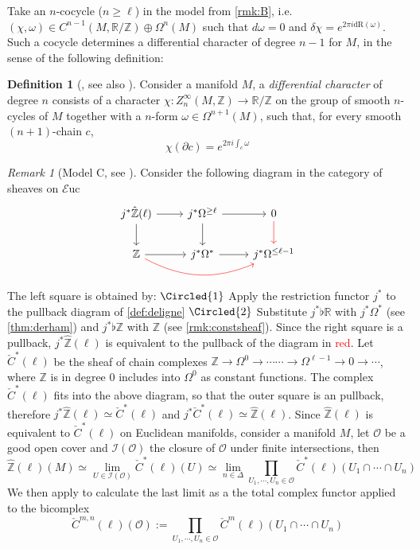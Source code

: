 \documentclass[10pt]{amsart}
\newcommand{\I}{\mathscr{I}}
\newcommand{\bR}{\mathbb{R}}
\newcommand{\bZ}{\mathbb{Z}}
\newcommand{\Euc}{\mathscr{E}\mathrm{uc}}
\newcommand{\dr}{\mathrm{dR}}
\theoremstyle{definition}
\newtheorem{definition}[equation]{Definition}
\theoremstyle{remark}
\newtheorem{remark}[equation]{Remark}
\numberwithin{equation}{section}
\begin{document}
Take an $n$-cocycle ($n\geq\ell$) in the model from \cref{rmk:B}, i.e. $(\chi,\omega)\in C^{n-1}(M,\bR/\bZ)\oplus\Omega^{n}(M)$ such that $d\omega=0$ and $\delta\chi=e^{2\pi i\dr(\omega)}$. Such a cocycle determines a differential character of degree $n-1$ for $M$, in the sense of the following definition:
\begin{definition}[{\cite[Definition 3.4]{hopkinssinger2005diffcoh}}, see also {\cite[Chapter 5]{barbecker2014diffchar}}] Consider a manifold $M$, a \emph{differential character} of degree $n$ consists of a character $\chi:Z^\infty_{n}(M,\bZ)\to\bR/\bZ$ on the group of smooth $n$-cycles of $M$ together with a $n$-form $\omega\in\Omega^{n+1}(M)$, such that, for every smooth $(n+1)$-chain $c$, \[\chi(\partial c)=e^{2\pi i\int_c\omega}\]
\end{definition}

\begin{remark}[Model C, see {\cite[Lemma 7.3.4]{amabeldebrayhaine2021diffcoh}}]\label{rmk:C} Consider the following diagram in the category of {sheaves} on $\Euc$
  \[\begin{tikzcd}
     j^*\hat{\bZ}(\ell)\arrow[d]\arrow[r] & j^*\Omega^{\geq \ell}\arrow[d] \arrow[r] & 0\arrow[d,color=red] \\
    \bZ \arrow[r]\arrow[rr,bend right=2.5em,color=red] & j^*\Omega^*\arrow[r] & j^*\Omega^{\leq\ell-1}
  \end{tikzcd}\] The left square is obtained by: $\Circled{1}$ Apply the restriction functor $j^*$ to the pullback diagram of \cref{def:deligne} $\Circled{2}$ Substitute $j^*\flat\bR$ with $j^*\Omega^*$ (see \cref{thm:derham}) and $j^*\flat\bZ$ with $\bZ$ (see \cref{rmk:constsheaf}). Since the right square is a pullback, $j^*\hat{\bZ}(\ell)$ is equivalent to the pullback of the diagram in \textcolor{red}{red}. Let $\check{C}^*(\ell)$ be the sheaf of chain complexes $\bZ\to\Omega^0\to\cdots\cdots\to\Omega^{\ell-1}\to0\to\cdots$, where $\bZ$ is in degree 0 includes into $\Omega^0$ as constant functions. The complex $\check{C}^*(\ell)$ fits into the above diagram, so that the outer square is an pullback, therefore $j^*\hat{\bZ}(\ell)\simeq\check{C}^*(\ell)$ and $j^*\check{C}^*(\ell)\simeq\hat{\bZ}(\ell)$. Since $\hat{\bZ}(\ell)$ is equivalent to $\check{C}^*(\ell)$ on Euclidean manifolds, consider a manifold $M$, let $\mathscr{O}$ be a good open cover and $\I(\mathscr O)$ the closure of $\mathscr{O}$ under finite intersections, then
\[
    \hat{\bZ}(\ell)(M) \simeq\lim_{U\in\I(\mathscr O)} \check{C}^*(\ell)(U)\simeq\lim_{n\in\Delta}\prod_{U_1,\cdots,U_n\in\mathscr{O}}\check{C}^*(\ell)(U_1\cap\cdots\cap U_n) 
  \]
  We then apply \cite[Lemma 7.10]{bunkenikolausvoelkl2016diffcoh} to calculate the last limit as a the total complex functor applied to the bicomplex \[\check{C}^{m,n}(\ell)(\mathscr{O}):=\prod_{U_1,\cdots,U_n\in\mathscr{O}}\check{C}^m(\ell)(U_1\cap\cdots\cap U_n)\]
\end{remark}
\end{document}

